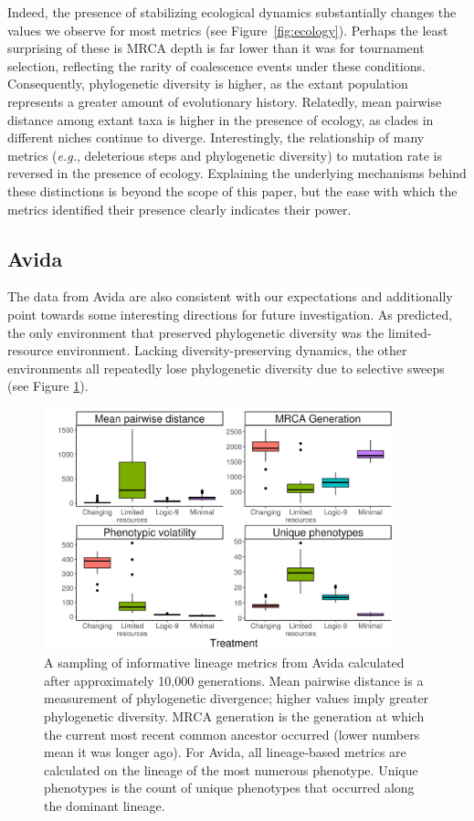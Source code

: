 \documentclass[letterpaper]{article}
\begin{document}
Indeed, the presence of stabilizing ecological dynamics substantially changes the values we observe for most metrics (see Figure~\ref{fig:ecology}). Perhaps the least surprising of these is MRCA depth is far lower than it was for tournament selection, reflecting the rarity of coalescence events under these conditions. Consequently, phylogenetic diversity is higher, as the extant population represents a greater amount of evolutionary history. Relatedly, mean pairwise distance among extant taxa is higher in the presence of ecology, as clades in different niches continue to diverge. Interestingly, the relationship of many metrics (\textit{e.g.}, deleterious steps and phylogenetic diversity) to mutation rate is reversed in the presence of ecology. Explaining the underlying mechanisms behind these distinctions is beyond the scope of this paper, but the ease with which the metrics identified their presence clearly indicates their power.


\subsection{Avida}

The data from Avida are also consistent with our expectations and additionally point towards some interesting directions for future investigation. As predicted, the only environment that preserved phylogenetic diversity was the limited-resource environment. Lacking diversity-preserving dynamics, the other environments all repeatedly lose phylogenetic diversity due to selective sweeps (see Figure \ref{fig:avida_metrics}).

\begin{figure}
    \centering
    \includegraphics[width=4in]{figs/metrics_avida.png}
    \caption{\small A sampling of informative lineage metrics from Avida calculated after approximately 10,000 generations. Mean pairwise distance is a measurement of phylogenetic divergence; higher values imply greater phylogenetic diversity. MRCA generation is the generation at which the current most recent common ancestor occurred (lower numbers mean it was longer ago). For Avida, all lineage-based metrics are calculated on the lineage of the most numerous phenotype. Unique phenotypes is the count of unique phenotypes that occurred along the dominant lineage.}
    \label{fig:avida_metrics}
\end{figure}
\end{document}
